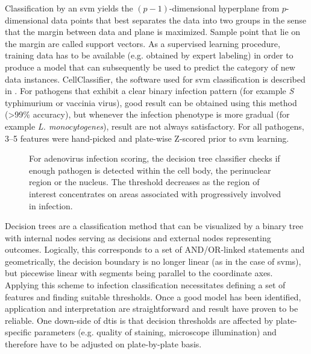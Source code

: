 Classification by an \gls{svm} yields the $(p-1)$-dimensional hyperplane from $p$-dimensional data points that best separates the data into two groups in the sense that the margin between data and plane is maximized. Sample point that lie on the margin are called support vectors. As a supervised learning procedure, training data has to be available (e.g. obtained by expert labeling) in order to produce a model that can subsequently be used to predict the category of new data instances. CellClassifier, the software used for \gls{svm} classification is described in \cite{Ramo2009}. For pathogens that exhibit a clear binary infection pattern (for example \textit{S} typhimurium or vaccinia virus), good result can be obtained using this method (\textgreater 99\% accuracy), but whenever the infection phenotype is more gradual (for example \textit{L. monocytogenes}), result are not always satisfactory. For all pathogens, 3--5 features were hand-picked and plate-wise Z-scored prior to \gls{svm} learning.

\begin{figure}
  \centering
  \caption[Decision tree for adenovirus infection scoring.]{For adenovirus infection scoring, the decision tree classifier checks if enough pathogen is detected within the cell body, the perinuclear region or the nucleus. The threshold decreases as the region of interest concentrates on areas associated with progressively involved in infection.}
  \label{fig:dectree-adeno}
\end{figure}

Decision trees are a classification method that can be visualized by a binary tree with internal nodes serving as decisions and external nodes representing outcomes. Logically, this corresponds to a set of AND\slash OR-linked statements and geometrically, the decision boundary is no longer linear (as in the case of \glspl{svm}), but piecewise linear with segments being parallel to the coordinate axes. Applying this scheme to infection classification necessitates defining a set of features and finding suitable thresholds. Once a good model has been identified, application and interpretation are straightforward and result have proven to be reliable. One down-side of \gls{dtis} is that decision thresholds are affected by plate-specific parameters (e.g. quality of staining, microscope illumination) and therefore have to be adjusted on plate-by-plate basis.

